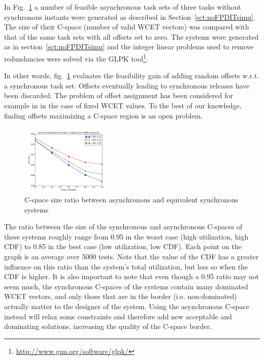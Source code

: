 \documentclass[conference]{IEEEtran}
\begin{document}
	In Fig.~\ref{fig:sizeRatio} a number of feasible asynchronous task sets of
	three tasks without synchronous instants were generated as described in Section~\ref{sct:noFPDITsimu}. The size of their
	C-space (number of valid WCET vectors) was compared with that of the same
	task sets with all offsets set to zero. The systems were generated as in section~\ref{sct:noFPDITsimu}
	and the integer linear problems used to remove redundancies were solved via the GLPK tool\footnote{\url{http://www.gnu.org/software/glpk/}}.

	In other words, fig.~\ref{fig:sizeRatio}
	evaluates the feasibility gain of adding random offsets w.r.t. a synchronous task
	set. Offsets eventually leading to synchronous releases have been discarded. The problem of offset assignment has been considered for example in \cite{grenier2008pushing} in the case of fixed WCET values. To the best of our knowledge, finding offsets maximizing a C-space region is an open problem.

	\begin{figure}[h]
		\begin{center}
			\includegraphics[width=0.4\textwidth]{figs/sizeratio.png}
			\caption{C-space size ratio between asynchronous and equivalent synchronous
			systems}
			\label{fig:sizeRatio}
		\end{center}
	\end{figure}

	The ratio between the size of the synchronous and asynchronous C-spaces of
	these systems roughly range from 0.95 in the worst case (high utilization, high
	CDF) to 0.85 in the best case (low utilization, low CDF). Each point on the graph is an average over 5000 tests.
	Note that the value of the CDF has a greater influence on this ratio than
	the system's total utilization, but less so when the CDF is higher. It is also
	important to note that even though a 0.95 ratio may not seem much, the
	synchronous C-spaces of the systems contain many dominated WCET vectors, and
	only those that are in the border (i.e. non-dominated) actually matter to the
	designer of the system. Using the asynchronous C-space instead will relax some
	constraints and therefore add new acceptable and dominating solutions,
	increasing the quality of the C-space border.
\end{document}
